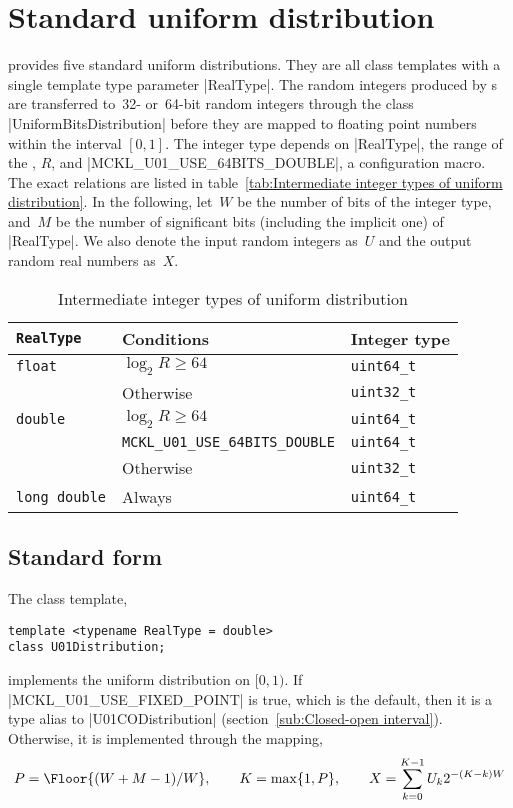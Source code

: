\section{Standard uniform distribution}
\label{sec:Standard uniform distribution}

\mckl provides five standard uniform distributions. They are all class
templates with a single template type parameter |RealType|. The random integers
produced by \rng{}s are transferred to~32- or~64-bit random integers through
the class |UniformBitsDistribution| before they are mapped to floating point
numbers within the interval $[0, 1]$. The integer type depends on |RealType|,
the range of the \rng{}, $R$, and |MCKL_U01_USE_64BITS_DOUBLE|, a configuration
macro. The exact relations are listed in table~\ref{tab:Intermediate integer
types of uniform distribution}. In the following, let~$W$ be the number of bits
of the integer type, and~$M$ be the number of significant bits (including the
implicit one) of |RealType|. We also denote the input random integers as~$U$
and the output random real numbers as~$X$.

\begin{table}
  \begin{tabularx}{\textwidth}{LlL}
    \toprule
    \texttt{RealType} & Conditions & Integer type \\
    \midrule
    \texttt{float}  & $\log_2 R \ge 64$ & \texttt{uint64\_t} \\
                    & Otherwise         & \texttt{uint32\_t} \\
    \texttt{double} & $\log_2 R \ge 64$ & \texttt{uint64\_t} \\
    & \texttt{MCKL\_U01\_USE\_64BITS\_DOUBLE} & \texttt{uint64\_t} \\
    & Otherwise & \texttt{uint32\_t} \\
    \texttt{long double} & Always & \texttt{uint64\_t} \\
    \bottomrule
  \end{tabularx}
  \caption{Intermediate integer types of uniform distribution}
  \label{tab:Intermediate integer types of uniform distribution}
\end{table}

\subsection{Standard form}
\label{sub:Standard form}

The class template,
\begin{verbatim}
template <typename RealType = double>
class U01Distribution;
\end{verbatim}
implements the uniform distribution on $[0, 1)$. If |MCKL_U01_USE_FIXED_POINT|
  is true, which is the default, then it is a type alias to |U01CODistribution|
  (section~\ref{sub:Closed-open interval}). Otherwise, it is implemented
  through the mapping,
\begin{equation*}
  P = \Floor{(W + M - 1) / W},\qquad
  K = \max\{1, P\},\qquad
  X = \sum_{k=0}^{K - 1} U_k 2^{-(K - k)W}
\end{equation*}

